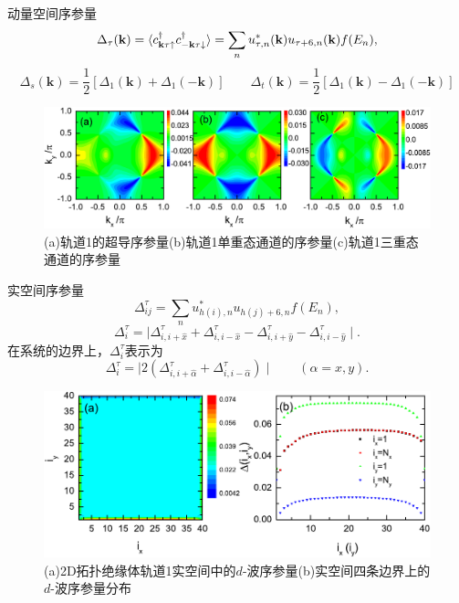 \documentclass[10pt,aspectratio=169]{beamer} %
\begin{document}
\begin{frame}{动量空间序参量}
	\begin{equation}
	\Delta_\tau({\bf k})=\langle c^\dagger_{{\bf k}\tau\uparrow}c^\dagger_{-{\bf k}\tau\downarrow}\rangle=\sum_n{u^{*}_{\tau,n}({\bf k})u_{\tau+6,n}({\bf k})}f(E_n),
	\end{equation}
\begin{equation}
\Delta_s(\mathbf{k})=\frac{1}{2}\left[\Delta_1(\mathbf{k})+\Delta_1(\mathbf{-k})\right]\qquad
\Delta_t(\mathbf{k})=\frac{1}{2}\left[\Delta_1(\mathbf{k})-\Delta_1(\mathbf{-k})\right]
\end{equation}
\begin{figure}[h]
\centering
\includegraphics[scale=0.13]{pic/fig20}
\caption{(a)轨道1的超导序参量(b)轨道1单重态通道的序参量(c)轨道1三重态通道的序参量}\label{fig19}
\end{figure}
\end{frame}
\begin{frame}{实空间序参量}
\begin{equation}
\Delta^\tau_{ij}=\sum_nu^{*}_{h(i),n}u_{h(j)+6,n}f(E_n),
\end{equation}
\begin{equation}
\Delta^\tau_i=\mid \Delta^\tau_{i,i+\hat{x}}+\Delta^\tau_{i,i-\hat{x}}
-\Delta^\tau_{i,i+\hat{y}}-\Delta^\tau_{i,i-\hat{y}}\mid.
\end{equation}
在系统的边界上，$\Delta_i^\tau$表示为
\begin{equation}
\Delta^\tau_i=\mid 2(\Delta^\tau_{i,i+\hat{\alpha}}+\Delta^\tau_{i,i-\hat{\alpha}}) \mid  \qquad (\alpha=x,y).
\end{equation}
\begin{figure}[h]
\centering
\includegraphics[scale=0.5]{pic/fig21}
\caption{(a)2D拓扑绝缘体轨道1实空间中的$d$-波序参量(b)实空间四条边界上的$d$-波序参量分布}\label{fig20}
\end{figure}
\end{frame}
\end{document}
